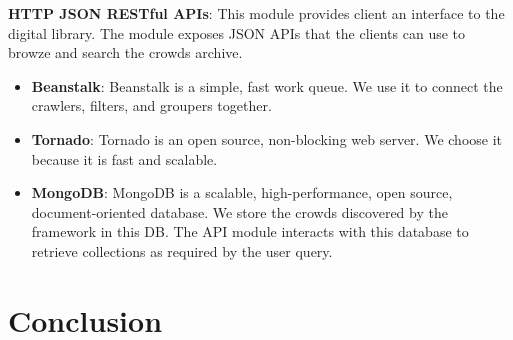 \documentclass{sig-alternate}
\begin{document}
\medskip \noindent \textbf{HTTP JSON RESTful APIs}: This module provides client an interface to the digital library. The module exposes JSON APIs that the clients can use to browze and search the crowds archive.

\begin{itemize}
  \item \noindent\textbf{Beanstalk}: Beanstalk is a simple, fast work queue. We use it to connect the crawlers, filters, and groupers together.
   \item \noindent\textbf{Tornado}: Tornado is an open source, non-blocking web server.  We choose it because it is fast and scalable.
   \item \noindent\textbf{MongoDB}: MongoDB is a scalable, high-performance, open source, document-oriented database. We store the crowds discovered by the framework in this DB. The API module interacts with this database to retrieve collections as required by the user query.
\end{itemize}

\section{Conclusion}
\label{sec:conclusion}

{\scriptsize
 
 
}
\balancecolumns %
\end{document}
